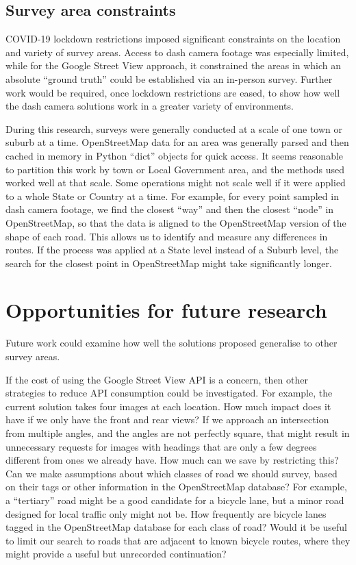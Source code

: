 \documentclass[11pt,twoside]{report}
\begin{document}
\subsection{Survey area constraints}

COVID-19 lockdown restrictions imposed significant constraints on the location and variety of survey areas.  Access to dash camera footage was especially limited, while for the Google Street View approach, it constrained the areas in which an absolute ``ground truth'' could be established via an in-person survey.  Further work would be required, once lockdown restrictions are eased, to show how well the dash camera solutions work in a greater variety of environments.

During this research, surveys were generally conducted at a scale of one town or suburb at a time.  OpenStreetMap data for an area was generally parsed and then cached in memory in Python ``dict'' objects for quick access.  It seems reasonable to partition this work by town or Local Government area, and the methods used worked well at that scale.  Some operations might not scale well if it were applied to a whole State or Country at a time.  For example, for every point sampled in dash camera footage, we find the closest ``way'' and then the closest ``node'' in OpenStreetMap, so that the data is aligned to the OpenStreetMap version of the shape of each road.  This allows us to identify and measure any differences in routes.  If the process was applied at a State level instead of a Suburb level, the search for the closest point in OpenStreetMap might take significantly longer.


\section{Opportunities for future research}
\label{s:future_work}

Future work could examine how well the solutions proposed generalise to other survey areas.

If the cost of using the Google Street View API is a concern, then other strategies to reduce API consumption could be investigated.  For example, the current solution takes four images at each location.  How much impact does it have if we only have the front and rear views?  If we approach an intersection from multiple angles, and the angles are not perfectly square, that might result in unnecessary requests for images with headings that are only a few degrees different from ones we already have.  How much can we save by restricting this?  Can we make assumptions about which classes of road we should survey, based on their tags or other information in the OpenStreetMap database?  For example, a ``tertiary'' road might be a good candidate for a bicycle lane, but a minor road designed for local traffic only might not be.  How frequently are bicycle lanes tagged in the OpenStreetMap database for each class of road?  Would it be useful to limit our search to roads that are adjacent to known bicycle routes, where they might provide a useful but unrecorded continuation?
\end{document}
